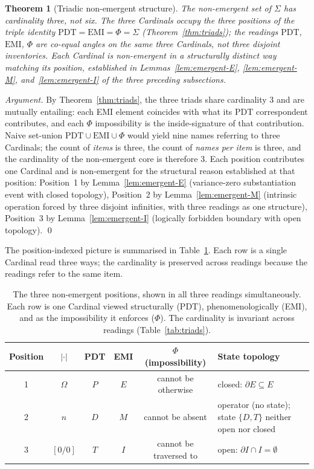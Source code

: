 \documentclass[11pt,a4paper]{article}
\newtheorem{theorem}{Theorem}[section]
\theoremstyle{definition}
\theoremstyle{remark}
\begin{document}
\begin{theorem}[Triadic non-emergent structure]\label{thm:nonemergent-triadic}
The non-emergent set of $\Sigma$ has cardinality three, not six. The three Cardinals occupy the three positions of the triple identity $\mathrm{PDT}=\mathrm{EMI}=\Phi=\Sigma$ (Theorem~\ref{thm:triads}); the readings $\mathrm{PDT}$, $\mathrm{EMI}$, $\Phi$ are co-equal angles on the same three Cardinals, not three disjoint inventories. Each Cardinal is non-emergent in a structurally distinct way matching its position, established in Lemmas~\ref{lem:emergent-E}, \ref{lem:emergent-M}, and~\ref{lem:emergent-I} of the three preceding subsections.
\end{theorem}

\begin{proof}[Argument]
By Theorem~\ref{thm:triads}, the three triads share cardinality $3$ and are mutually entailing: each EMI element coincides with what its PDT correspondent contributes, and each $\Phi$ impossibility is the inside-signature of that contribution. Naive set-union $\mathrm{PDT}\cup\mathrm{EMI}\cup\Phi$ would yield nine names referring to three Cardinals; the count of \emph{items} is three, the count of \emph{names per item} is three, and the cardinality of the non-emergent core is therefore $3$. Each position contributes one Cardinal and is non-emergent for the structural reason established at that position: Position~1 by Lemma~\ref{lem:emergent-E} (variance-zero substantiation event with closed topology), Position~2 by Lemma~\ref{lem:emergent-M} (intrinsic operation forced by three disjoint infinities, with three readings as one structure), Position~3 by Lemma~\ref{lem:emergent-I} (logically forbidden boundary with open topology). \qed
\end{proof}

The position-indexed picture is summarised in Table~\ref{tab:antiemergent-positions}. Each row is a single Cardinal read three ways; the cardinality is preserved across readings because the readings refer to the same item.

\begin{table}[h]
\centering
\begin{tabular}{@{}c c c c c >{\raggedright\arraybackslash}p{}@{}}
\toprule
Position & $|\cdot|$ & PDT & EMI & $\Phi$ (impossibility) & State topology\\
\midrule
1 & $\Omega$    & $P$ & $E$ & cannot be otherwise        & closed: $\partial E \subseteq E$\\
2 & $n$         & $D$ & $M$ & cannot be absent            & operator (no state); state $\{D,T\}$ neither open nor closed\\
3 & $[0/0]$     & $T$ & $I$ & cannot be traversed to     & open: $\partial I \cap I = \emptyset$\\
\bottomrule
\end{tabular}
\caption{The three non-emergent positions, shown in all three readings simultaneously. Each row is one Cardinal viewed structurally (PDT), phenomenologically (EMI), and as the impossibility it enforces ($\Phi$). The cardinality is invariant across readings (Table~\ref{tab:triads}).}
\label{tab:antiemergent-positions}
\end{table}
\end{document}

